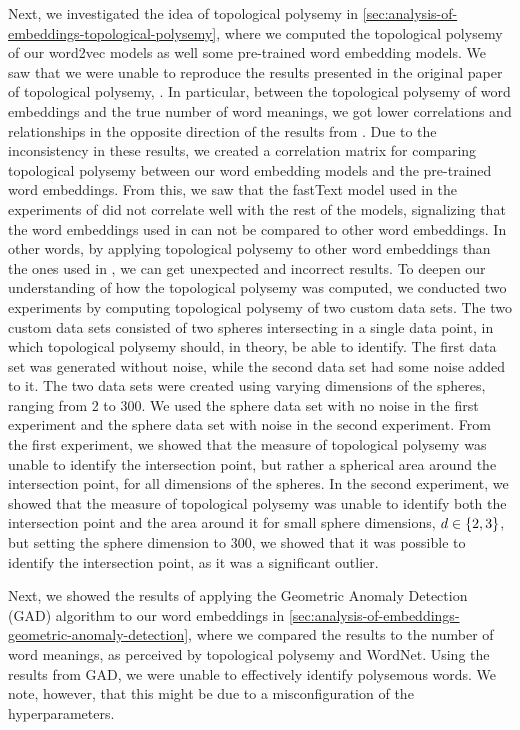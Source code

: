 Next, we investigated the idea of topological polysemy in \cref{sec:analysis-of-embeddings-topological-polysemy}, where we computed the topological polysemy of our word2vec models as well some pre-trained word embedding models. We saw that we were unable to reproduce the results presented in the original paper of topological polysemy, \cite{jakubowski2020topology}. In particular, between the topological polysemy of word embeddings and the true number of word meanings, we got lower correlations and relationships in the opposite direction of the results from \cite{jakubowski2020topology}. Due to the inconsistency in these results, we created a correlation matrix for comparing topological polysemy between our word embedding models and the pre-trained word embeddings. From this, we saw that the fastText model used in the experiments of \cite{jakubowski2020topology} did not correlate well with the rest of the models, signalizing that the word embeddings used in \cite{jakubowski2020topology} can not be compared to other word embeddings. In other words, by applying topological polysemy to other word embeddings than the ones used in \cite{jakubowski2020topology}, we can get unexpected and incorrect results. To deepen our understanding of how the topological polysemy was computed, we conducted two experiments by computing topological polysemy of two custom data sets. The two custom data sets consisted of two spheres intersecting in a single data point, in which topological polysemy should, in theory, be able to identify. The first data set was generated without noise, while the second data set had some noise added to it. The two data sets were created using varying dimensions of the spheres, ranging from 2 to 300. We used the sphere data set with no noise in the first experiment and the sphere data set with noise in the second experiment. From the first experiment, we showed that the measure of topological polysemy was unable to identify the intersection point, but rather a spherical area around the intersection point, for all dimensions of the spheres. In the second experiment, we showed that the measure of topological polysemy was unable to identify both the intersection point and the area around it for small sphere dimensions, $d \in \left\{2, 3\right\}$, but setting the sphere dimension to 300, we showed that it was possible to identify the intersection point, as it was a significant outlier.

Next, we showed the results of applying the Geometric Anomaly Detection (GAD) algorithm to our word embeddings in \cref{sec:analysis-of-embeddings-geometric-anomaly-detection}, where we compared the results to the number of word meanings, as perceived by topological polysemy and WordNet. Using the results from GAD, we were unable to effectively identify polysemous words. We note, however, that this might be due to a misconfiguration of the hyperparameters.

